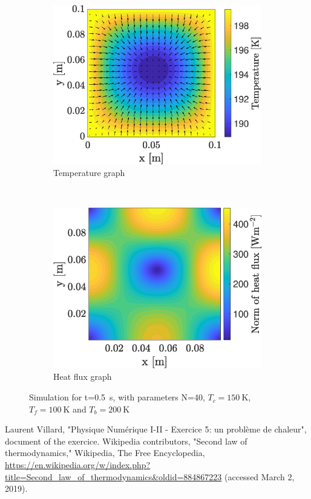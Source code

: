 \documentclass[a4paper,12pt,twoside]{article}
\begin{document}
\begin{figure}[h]
  \centering
  \begin{subfigure}[t]{0.45\textwidth}
    \includegraphics[width=\textwidth]{graphs/f2_temp.eps}
    \caption{Temperature graph}
    \label{fig:fac2-temp}
  \end{subfigure}
  ~
  \begin{subfigure}[t]{0.45\textwidth}
    \includegraphics[width=\textwidth]{graphs/f2_heat_flux.eps}
    \caption{Heat flux graph}
    \label{fig:fac2-heat-flux.eps}
  \end{subfigure}
  \caption{Simulation for t=\SI{0.5}{\s}, with parameters N=40, $T_c=\SI{150}{\kelvin}$, $T_f=\SI{100}{\kelvin}$ and $T_b=\SI{200}{\kelvin}$}
  \label{fig:fac2}
\end{figure}

\begin{thebibliography}{99}
   Laurent Villard, "Physique Numérique I-II - Exercice 5: un problème de chaleur", document of the exercice.
   Wikipedia contributors, "Second law of thermodynamics," Wikipedia, The Free Encyclopedia, \url{https://en.wikipedia.org/w/index.php?title=Second_law_of_thermodynamics&oldid=884867223} (accessed March 2, 2019).


\end{thebibliography}
\end{document}
